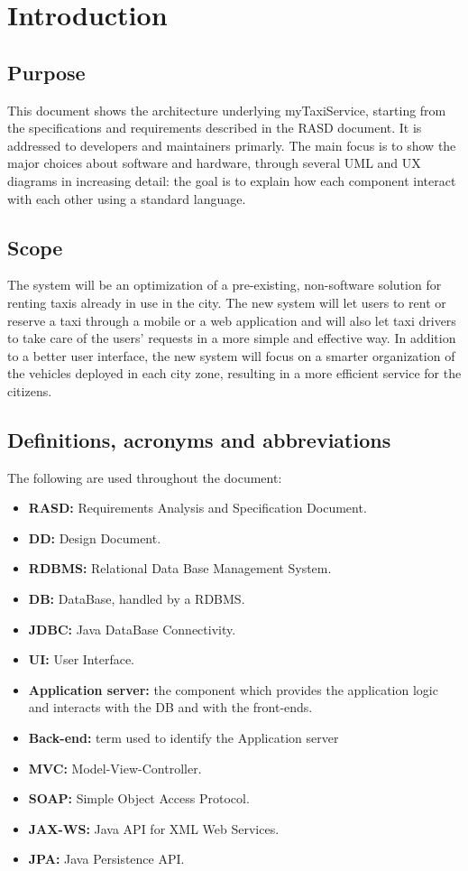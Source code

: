 \section{Introduction}

\subsection{Purpose}
This document shows the architecture underlying myTaxiService, starting from the specifications and requirements described in the RASD document. It is addressed to developers and maintainers primarly. The main focus is to show the major choices about software and hardware, through several UML and UX diagrams in increasing detail: the goal is to explain how each component interact with each other using a standard language.

\subsection{Scope}
The system will be an optimization of a pre-existing, non-software solution for renting taxis already in use in the city. The new system will let users to rent or reserve a taxi through a mobile or a web application and will also let taxi drivers to take care of the users' requests in a more simple and effective way. In addition to a better user interface, the new system will focus on a smarter organization of the vehicles deployed in each city zone, resulting in a more efficient service for the citizens.

\subsection{Definitions, acronyms and abbreviations}
The following are used throughout the document:
\begin{itemize}
\item\textbf{RASD:} Requirements Analysis and Specification Document.
\item\textbf{DD:} Design Document.
\item\textbf{RDBMS:} Relational Data Base Management System.
\item\textbf{DB:} DataBase, handled by a RDBMS.
\item\textbf{JDBC:} Java DataBase Connectivity.
\item\textbf{UI:} User Interface.
\item\textbf{Application server:} the component which provides the application logic and interacts with the DB and with the front-ends.
\item\textbf{Back-end:} term used to identify the Application server
\item\textbf{MVC:} Model-View-Controller.
\item\textbf{SOAP:} Simple Object Access Protocol.
\item\textbf{JAX-WS:} Java API for XML Web Services.
\item\textbf{JPA:} Java Persistence API.
\end{itemize}

